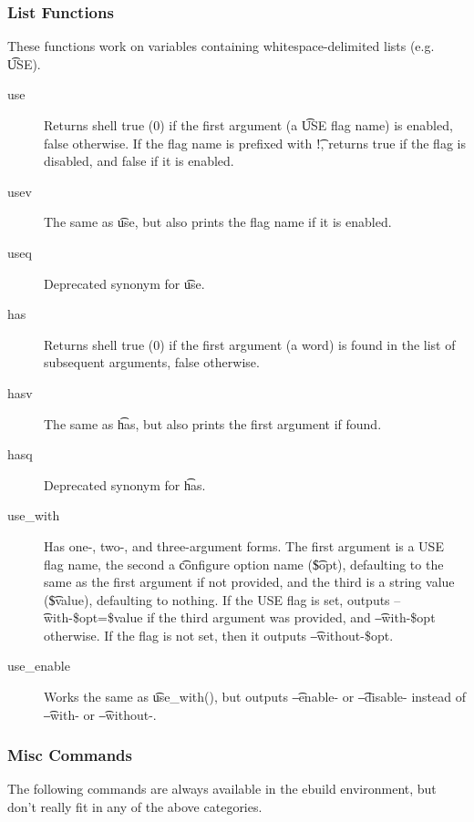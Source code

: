 \subsubsection{List Functions}
These functions work on variables containing whitespace-delimited lists (e.g. \t{USE}).

\begin{description}
\item[use] Returns shell true (0) if the first argument (a \t{USE} flag name) is enabled, false
    otherwise.  If the flag name is prefixed with \t{!}, returns true if the flag is disabled, and
    false if it is enabled.
\item[usev] The same as \t{use}, but also prints the flag name if it is enabled.
\item[useq] Deprecated synonym for \t{use}.
\\
\item[has] Returns shell true (0) if the first argument (a word) is found in the list of subsequent
    arguments, false otherwise.
\item[hasv] The same as \t{has}, but also prints the first argument if found.
\item[hasq] Deprecated synonym for \t{has}.
\\
\item[use\_with] Has one-, two-, and three-argument forms. The first argument is a USE flag name,
    the second a \t{configure} option name (\t{\$opt}), defaulting to the same as the first argument
    if not provided, and the third is a string value (\t{\$value}), defaulting to nothing. If the
    USE flag is set, outputs \t{--with-\$opt=\$value} if the third argument was provided, and
    \t{--with-\$opt} otherwise. If the flag is not set, then it outputs \t{--without-\$opt}.

\item[use\_enable] Works the same as \t{use\_with()}, but outputs \t{--enable-} or \t{--disable-}
instead of \t{--with-} or \t{--without-}.
\end{description}

\subsubsection{Misc Commands}
The following commands are always available in the ebuild environment, but don't really fit in any
of the above categories.

